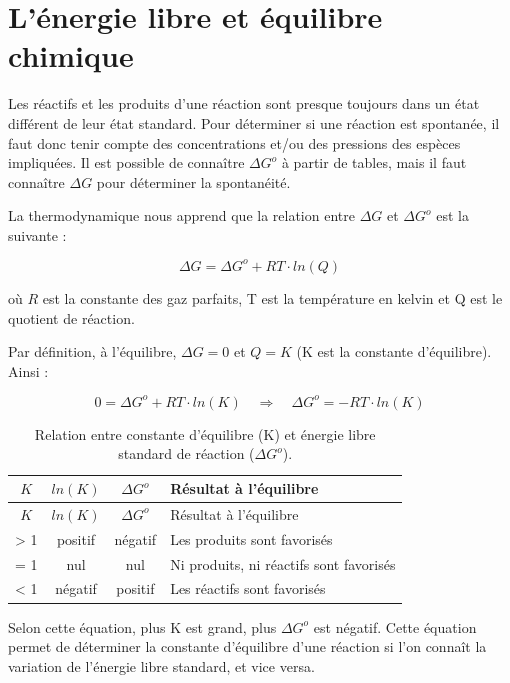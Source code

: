 \documentclass[
  11pt,
  french,
  a4paper,
  openany]{book}
\begin{document}
\clearpage

\hypertarget{luxe9nergie-libre-et-uxe9quilibre-chimique}{%
\section{L'énergie libre et équilibre chimique}\label{luxe9nergie-libre-et-uxe9quilibre-chimique}}

Les réactifs et les produits d'une réaction sont presque toujours dans un état différent de leur état standard. Pour déterminer si une réaction est spontanée, il faut donc tenir compte des concentrations et/ou des pressions des espèces impliquées. Il est possible de connaître \(\Delta G^o\) à partir de tables, mais il faut connaître \(\Delta G\) pour déterminer la spontanéité.

La thermodynamique nous apprend que la relation entre \(\Delta G\) et \(\Delta G^o\) est la suivante :

\[
\Delta G = \Delta G^o + RT \cdot ln(Q)
\]

où \(R\) est la constante des gaz parfaits, T est la température en kelvin et Q est le quotient de réaction.

Par définition, à l'équilibre, \(\Delta G = 0\) et \(Q = K\) (K est la constante d'équilibre). Ainsi :

\[
0 = \Delta G^o + RT \cdot ln(K) \quad \Rightarrow \quad \Delta G^o = - RT \cdot ln(K)
\]

\begin{longtable}[]{@{}cccl@{}}
\caption{\label{tab:spontaneiteDGK} Relation entre constante d'équilibre (K) et énergie libre standard de réaction (\(\Delta G^o\)).}\tabularnewline
\toprule
\(K\) & \(ln(K)\) & \(\Delta G^o\) & Résultat à l'équilibre\tabularnewline
\midrule
\endfirsthead
\toprule
\(K\) & \(ln(K)\) & \(\Delta G^o\) & Résultat à l'équilibre\tabularnewline
\midrule
\endhead
\textgreater{} 1 & positif & négatif & Les produits sont favorisés\tabularnewline
= 1 & nul & nul & Ni produits, ni réactifs sont favorisés\tabularnewline
\textless{} 1 & négatif & positif & Les réactifs sont favorisés\tabularnewline
\bottomrule
\end{longtable}

Selon cette équation, plus K est grand, plus \(\Delta G^o\) est négatif. Cette équation permet de déterminer la constante d'équilibre d'une réaction si l'on connaît la variation de l'énergie libre standard, et vice versa.
\end{document}
